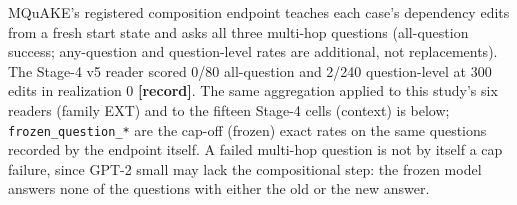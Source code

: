\documentclass[10pt,a4paper]{article}
\begin{document}
MQuAKE's registered composition endpoint teaches each case's dependency edits from a fresh start state and asks all three multi-hop questions (all-question success; any-question and question-level rates are additional, not replacements). The Stage-4 v5 reader scored 0/80 all-question and 2/240 question-level at 300 edits in realization 0 \textbf{[record]}. The same aggregation applied to this study's six readers (family EXT) and to the fifteen Stage-4 cells (context) is below; \texttt{frozen\_question\_*} are the cap-off (frozen) exact rates on the same questions recorded by the endpoint itself. A failed multi-hop question is not by itself a cap failure, since GPT-2 small may lack the compositional step: the frozen model answers none of the questions with either the old or the new answer.
\end{document}

